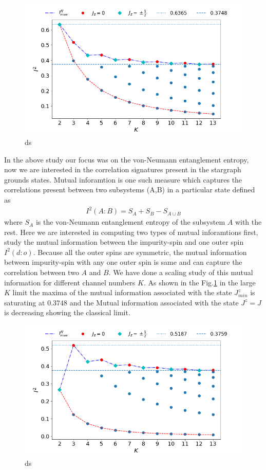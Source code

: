\documentclass[reprint,prb,superscriptaddress]{revtex4-2}
\begin{document}
\begin{figure}[!htpb]
\includegraphics[scale=0.32]{plt/NEW31Dec_I_2_vs_Nch_[0,1]}
\caption{ds}
\label{fig:MI_d_o}
\end{figure}
\noindent In the above study our focus was on the von-Neumann entanglement entropy, now we are interested in the correlation signatures present in the stargraph grounds states. Mutual inforamtion is one such measure which captures the correlations present between two subsystems (A,B) in a particular state defined as
\begin{eqnarray}
I^2(A:B)=S_A+S_B-S_{A\cup B}
\end{eqnarray}
where $S_{A}$ is the von-Neumann entanglement entropy of the subsystem $A$ with the rest. Here we are interested in computing two types of mutual inforamtions first, study the mutual information between the impurity-spin and one outer spin $I^2(d:o)$. Because all the outer spins are symmetric, the mutual information between impurity-spin with any one outer spin is same and can capture the correlation between two $A$ and $B$. We have done a scaling study of this mutual information for different channel numbers $K$. As shown in the Fig.\ref{fig:MI_d_o} in the large $K$ limit the maxima of the mutual information associated with the state $J^z_{min}$ is saturating at $0.3748$ and the Mutual information associated with the state $J^z=J$ is decreasing showing the classical limit.
\begin{figure}[!htpb]
\includegraphics[scale=0.32]{plt/NEW31Dec_I_2_vs_Nch_[1,2]}
\caption{ds}
\label{fig:MI_o_o}
\end{figure}
\end{document}
